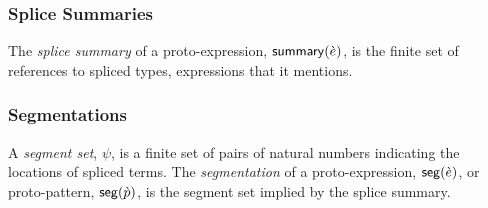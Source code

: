 \subsubsection{Splice Summaries}
The \emph{splice summary} of a proto-expression, $\mathsf{summary}(\grave{e})$,  is the finite set of references to spliced types, expressions  that it mentions.

\subsubsection{Segmentations}
A \emph{segment set}, $\psi$, is a finite set of pairs of natural numbers indicating the locations of spliced terms. The \emph{segmentation} of a proto-expression, $\mathsf{seg}(\grave{e})$, or proto-pattern, $\mathsf{seg}(\grave{p})$, is the segment set implied by the splice summary.




